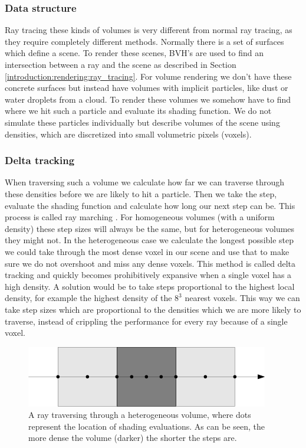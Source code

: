 \subsubsection{Data structure} \label{introduction:path_traced_volume_rendering:data_structure}
Ray tracing these kinds of volumes is very different from normal ray tracing, as they require completely different methods. Normally there is a set of surfaces which define a scene. To render these scenes, BVH's are used to find an intersection between a ray and the scene as described in Section \ref{introduction:rendering:ray_tracing}. For volume rendering we don't have these concrete surfaces but instead have volumes with implicit particles, like dust or water droplets from a cloud. To render these volumes we somehow have to find where we hit such a particle and evaluate its shading function. We do not simulate these particles individually but describe volumes of the scene using densities, which are discretized into small volumetric pixels (voxels).

\subsubsection{Delta tracking} \label{introduction:path_traced_volume_rendering:delta_tracking}
When traversing such a volume we calculate how far we can traverse through these densities before we are likely to hit a particle. Then we take the step, evaluate the shading function and calculate how long our next step can be. This process is called ray marching \cite{RenderingWithTwoTriangles}. For homogeneous volumes (with a uniform density) these step sizes will always be the same, but for heterogeneous volumes they might not. In the heterogeneous case we calculate the longest possible step we could take through the most dense voxel in our scene and use that to make sure we do not overshoot and miss any dense voxels. This method is called delta tracking \cite{kutz2017spectral} and quickly becomes prohibitively expansive when a single voxel has a high density. A solution would be to take steps proportional to the highest local density, for example the highest density of the $8^3$ nearest voxels. This way we can take step sizes which are proportional to the densities which we are more likely to traverse, instead of crippling the performance for every ray because of a single voxel.

\begin{figure}[H]
    \centering
    \includegraphics[width=0.9\linewidth]{figures/sample_step_size.png}
    \caption{A ray traversing through a heterogeneous volume, where dots represent the location of shading evaluations. As can be seen, the more dense the volume (darker) the shorter the steps are.}
    \label{fig:sample_step_size}
\end{figure}



